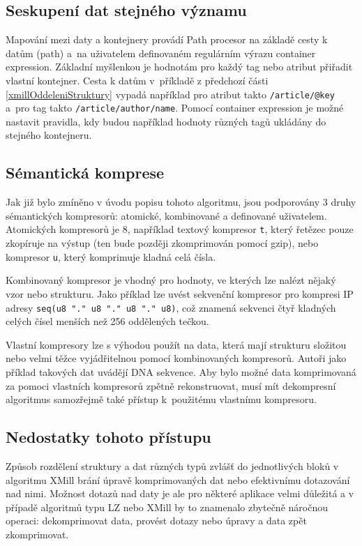\subsection{Seskupení dat stejného významu}
Mapování mezi daty a kontejnery provádí Path procesor na základě cesty k datům (path) a~na uživatelem definovaném regulárním výrazu container expression. Základní myšlenkou je hodnotám pro každý tag nebo atribut přiřadit vlastní kontejner. Cesta k datům v~příkladě z předchozí části \ref{xmillOddeleniStruktury} vypadá například  pro atribut takto \texttt{/article/@key} a~pro tag takto \texttt{/article/author/name}. Pomocí container expression je možné nastavit pravidla, kdy budou například hodnoty různých tagů ukládány do stejného kontejneru. \cite{xmill}

\subsection{Sémantická komprese}
Jak již bylo zmíněno v úvodu popisu tohoto algoritmu, jsou podporovány 3 druhy sé\-man\-ti\-ckých kompresorů: atomické, kombinované a definované uživatelem. Atomických kompresorů je 8, například textový kompresor \texttt{t}, který řetězec pouze zkopíruje na výstup (ten bude později zkomprimován pomocí gzip), nebo kompresor \texttt{u}, který komprimuje kladná celá čísla.

Kombinovaný kompresor je vhodný pro hodnoty, ve kterých lze nalézt nějaký vzor nebo strukturu. Jako příklad lze uvést sekvenční kompresor pro kompresi IP adresy \texttt{seq(u8 "." u8 "." u8 "." u8)}, což znamená sekvenci čtyř kladných celých čísel menších než 256 oddělených tečkou.

Vlastní kompresory lze s výhodou použít na data, která mají strukturu složitou nebo velmi těžce vyjádřitelnou pomocí kombinovaných kompresorů. Autoři jako příklad takových dat uvádějí DNA sekvence. Aby bylo možné data komprimovaná za pomoci vlastních kompresorů zpětně rekonstruovat, musí mít dekompresní algoritmus samozřejmě také přístup k~použitému vlastnímu kompresoru. \cite{xmill}

\subsection{Nedostatky tohoto přístupu}
Způsob rozdělení struktury a dat různých typů zvlášť do jednotlivých bloků v algoritmu XMill brání úpravě komprimovaných dat nebo efektivnímu dotazování nad nimi. Možnost dotazů nad daty je ale pro některé aplikace velmi důležitá a v případě algoritmů typu LZ nebo XMill by to znamenalo zbytečně náročnou operaci: dekomprimovat data, provést dotazy nebo úpravy a data zpět zkomprimovat.

